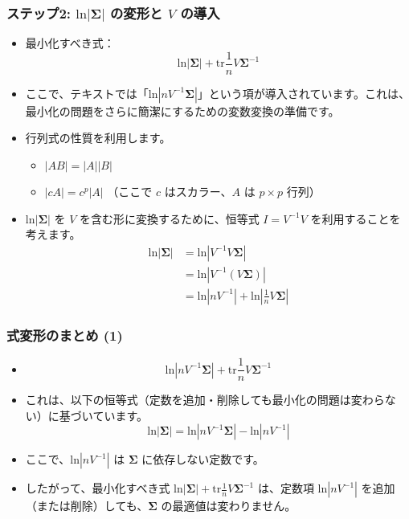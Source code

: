 \documentclass[aspectratio=169]{beamer}
\begin{document}
\begin{frame}
\frametitle{ステップ2: $\text{ln}|\bm{\Sigma}|$ の変形と $V$ の導入}
\begin{itemize}
    \item 最小化すべき式：
    \[ \text{ln}|\bm{\Sigma}|+\text{tr}\frac{1}{n}V\bm{\Sigma}^{-1} \]
    \item ここで、テキストでは「$\text{ln}|nV^{-1}\bm{\Sigma}|$」という項が導入されています。これは、最小化の問題をさらに簡潔にするための変数変換の準備です。
    \item 行列式の性質を利用します。
    \begin{itemize}
        \item $|AB|=|A||B|$
        \item $|cA|=c^p|A|$ （ここで $c$ はスカラー、$A$ は $p \times p$ 行列）
    \end{itemize}
    \item $\text{ln}|\bm{\Sigma}|$ を $V$ を含む形に変換するために、恒等式 $I=V^{-1}V$ を利用することを考えます。
    \begin{align*}
    \text{ln}|\bm{\Sigma}|&=\text{ln}|V^{-1}V\bm{\Sigma}| \\
    &=\text{ln}|V^{-1}(V\bm{\Sigma})| \\
    &=\text{ln}|nV^{-1}|+\text{ln}|\frac{1}{n}V\bm{\Sigma}|
    \end{align*}
\end{itemize}
\end{frame}
\begin{frame}
    \frametitle{式変形のまとめ (1)}
    \begin{itemize}
        \item 
        \[
        \text{ln}|nV^{-1}\bm{\Sigma}|+\text{tr}\frac{1}{n}V\bm{\Sigma}^{-1}
        \]
        \item これは、以下の恒等式（定数を追加・削除しても最小化の問題は変わらない）に基づいています。
        \[
        \text{ln}|\bm{\Sigma}| = \text{ln}|nV^{-1}\bm{\Sigma}| - \text{ln}|nV^{-1}|
        \]
        \item ここで、$\text{ln}|nV^{-1}|$ は $\bm{\Sigma}$ に依存しない定数です。
        \item したがって、最小化すべき式 $\text{ln}|\bm{\Sigma}|+\text{tr}\frac{1}{n}V\bm{\Sigma}^{-1}$ は、定数項 $\text{ln}|nV^{-1}|$ を追加（または削除）しても、$\bm{\Sigma}$ の最適値は変わりません。
    \end{itemize}
\end{frame}
\end{document}

